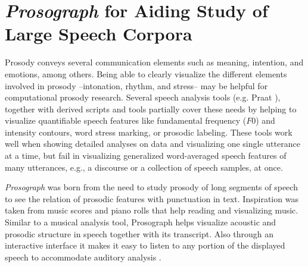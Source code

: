



\section{\textit{Prosograph} for Aiding Study of Large Speech Corpora}
\label{corpusWorks:prosograph}
Prosody conveys several communication elements such as meaning, intention, and emotions, among others. Being able to clearly visualize the different elements involved in prosody --intonation, rhythm, and stress-- may be helpful for computational prosody research. Several speech analysis tools (e.g. Praat \citep{boersma01}), together with derived scripts and tools \citep{xu2013prosodypro,mertens2004prosogram,praatontheweb} partially cover these needs by helping to visualize quantifiable speech features like fundamental frequency ($F0$) and intensity contours, word stress marking, or prosodic labeling. These tools work well when showing detailed analyses on data and visualizing one single utterance at a time, but fail in visualizing generalized word-averaged speech features of many utterances, e.g., a discourse or a collection of speech samples, at once.


\textit{Prosograph} was born from the need to study prosody of long segments of speech to see the relation of prosodic features with punctuation in text. Inspiration was taken from music scores and piano rolls that help reading and visualizing music. Similar to a musical analysis tool, Prosograph helps visualize acoustic and prosodic structure in speech together with its transcript. Also through an interactive interface it makes it easy to listen to any portion of the displayed speech to accommodate auditory analysis \citep{prosograph}. 

